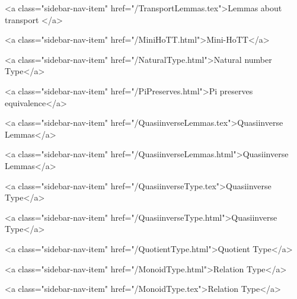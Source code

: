       
        
          <a class="sidebar-nav-item" href="/TransportLemmas.tex">Lemmas about transport </a>
        
      
    
      
        
          <a class="sidebar-nav-item" href="/MiniHoTT.html">Mini-HoTT</a>
        
      
    
      
        
          <a class="sidebar-nav-item" href="/NaturalType.html">Natural number Type</a>
        
      
    
      
        
          <a class="sidebar-nav-item" href="/PiPreserves.html">Pi preserves equivalence</a>
        
      
    
      
        
          <a class="sidebar-nav-item" href="/QuasiinverseLemmas.tex">Quasiinverse Lemmas</a>
        
      
    
      
        
          <a class="sidebar-nav-item" href="/QuasiinverseLemmas.html">Quasiinverse Lemmas</a>
        
      
    
      
        
          <a class="sidebar-nav-item" href="/QuasiinverseType.tex">Quasiinverse Type</a>
        
      
    
      
        
          <a class="sidebar-nav-item" href="/QuasiinverseType.html">Quasiinverse Type</a>
        
      
    
      
        
          <a class="sidebar-nav-item" href="/QuotientType.html">Quotient Type</a>
        
      
    
      
        
          <a class="sidebar-nav-item" href="/MonoidType.html">Relation Type</a>
        
      
    
      
        
          <a class="sidebar-nav-item" href="/MonoidType.tex">Relation Type</a>
        
